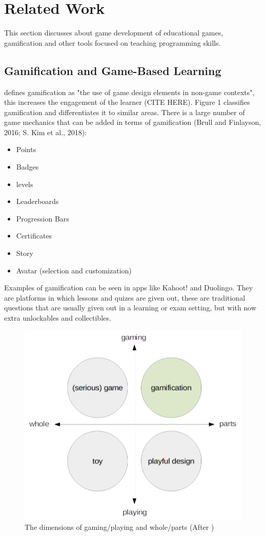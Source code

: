 \section{Related Work}
This section discusses about game development of educational games, gamification and other tools focused on teaching programming skills.

\subsection{Gamification and Game-Based Learning}
\cite{10.1145/2181037.2181040} defines gamification as "the use of game design elements in non-game contexts", this increases the engagement of the learner   (CITE HERE). Figure 1 classifies gamification and differentiates it to similar areas. There is a large number of game mechanics that can be added in terms of gamification (Brull and Finlayson, 2016; S. Kim et al., 2018):
\begin{itemize}
    \item Points
    \item Badges
    \item levels
    \item Leaderboards
    \item Progression Bars
    \item Certificates
    \item Story
    \item Avatar (selection and customization)
\end{itemize}

Examples of gamification can be seen in apps like Kahoot! and Duolingo. They are platforms in which lessons and quizes are given out, these are traditional questions that are usually given out in a learning or exam setting, but with now extra unlockables and collectibles. 

\begin{figure}[H]
    \centering
    \includegraphics[width=0.5\linewidth]{images/dimensions.png}
    \caption{The dimensions of gaming/playing and whole/parts (After \cite{10.1145/2181037.2181040})}
\end{figure}

